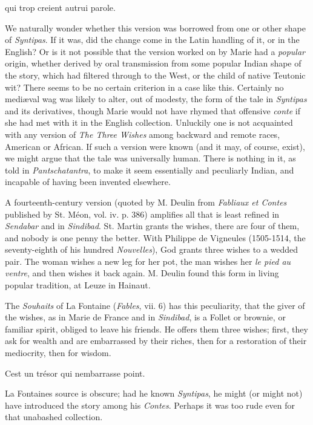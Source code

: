 \documentclass[14pt,a4paper]{memoir}
\begin{document}
{\textquotesingle qui trop creient autrui parole.\textquotesingle{}}

We naturally wonder whether this version was borrowed from one or other
shape of \emph{Syntipas}. If it was, did the change come in the Latin
handling of it, or in the English? Or is it not possible that the
version worked on by Marie had a \emph{popular} origin, whether derived
by oral transmission from some popular Indian shape of the story, which
had filtered through to the West, or the child of native Teutonic wit?
There seems to be no certain criterion in a case like this. Certainly no
mediæval wag was likely to alter, out of modesty, the form of the tale
in \emph{Syntipas} and its derivatives, though Marie would not have
rhymed that offensive \emph{conte} if she had met with it in the English
collection. Unluckily one is not acquainted with any version of
\emph{The Three Wishes} among backward and remote races, American or
African. If such a version were known (and it may, of course, exist), we
might argue that the tale was \textquotesingle universally
human.\textquotesingle{} There is nothing in it, as told in
\emph{Pantschatantra}, to make it seem essentially and peculiarly
Indian, and incapable of having been invented elsewhere.

A fourteenth-century version (quoted by M. Deulin from \emph{Fabliaux et
Contes} published by St. Méon, vol. iv. p. 386) amplifies all that is
least refined in \emph{Sendabar} and in \emph{Sindibad}. St. Martin
grants the wishes, there are four of them, and nobody is one penny the
better. With Philippe de Vigneules (1505-1514, the seventy-eighth of his
hundred \emph{Nouvelles}), God grants three wishes to a wedded pair. The
woman wishes a new leg for her pot, the man wishes her \emph{le pied au
ventre}, and then wishes it back again. M. Deulin found this form in
living popular tradition, at Leuze in Hainaut.

The \emph{Souhaits} of La Fontaine (\emph{Fables}, vii. 6) has this
peculiarity, that the giver of the wishes, as in Marie de France and in
\emph{Sindibad}, is a Follet or brownie, or familiar spirit, obliged to
leave his friends. He offers them three wishes; first, they ask for
wealth and are embarrassed by their riches, then for a restoration of
their mediocrity, then for wisdom.

{\textquotesingle C\textquotesingle est un trésor qui
n\textquotesingle embarrasse point.\textquotesingle{}}

La Fontaine\textquotesingle s source is obscure; had he known
\emph{Syntipas}, he might (or might not) have introduced the story among
his \emph{Contes}. Perhaps it was too rude even for that unabashed
collection.
\end{document}

